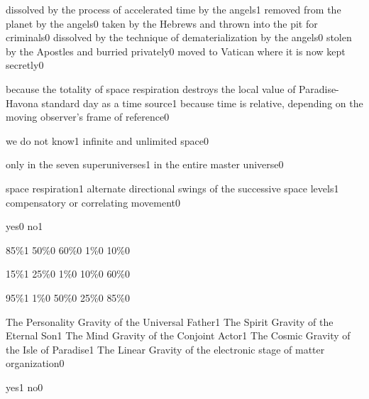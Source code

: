 {dissolved by the process of accelerated time by the angels}{1}
{removed from the planet by the angels}{0}
{taken by the Hebrews and thrown into the pit for criminals}{0}
{dissolved by the technique of dematerialization by the angels}{0}
{stolen by the Apostles and burried privately}{0}
{moved to Vatican where it is now kept secretly}{0}
\qstop

{because the totality of space respiration destroys the local value of Paradise-Havona standard day as a time source}{1}
{because time is relative, depending on the moving observer's frame of reference}{0}
\qstop

{we do not know}{1}
{infinite and unlimited space}{0}
\qstop

{only in the seven superuniverses}{1}
{in the entire master universe}{0}
\qstop

{space respiration}{1}
{alternate directional swings of the successive space levels}{1}
{compensatory or correlating movement}{0}
\qstop

{yes}{0}
{no}{1}
\qstop

{85\%}{1}
{50\%}{0}
{60\%}{0}
{1\%}{0}
{10\%}{0}
\qstop

{15\%}{1}
{25\%}{0}
{1\%}{0}
{10\%}{0}
{60\%}{0}
\qstop

{95\%}{1}
{1\%}{0}
{50\%}{0}
{25\%}{0}
{85\%}{0}
\qstop

{The Personality Gravity of the Universal Father}{1}
{The Spirit Gravity of the Eternal Son}{1}
{The Mind Gravity of the Conjoint Actor}{1}
{The Cosmic Gravity of the Isle of Paradise}{1}
{The Linear Gravity of the electronic stage of matter organization}{0}
\qstop

{yes}{1}
{no}{0}
\qstop

